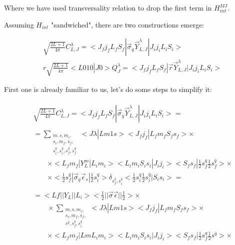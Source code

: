 Where we have used transversality relation to drop the first term in $H_{int}^{MJ}$.

Assuming $H_{int}$ "sandwiched", there are two constructions emerge:

\begin{align}
    &\sqrt{\frac{2L+1}{4\pi}} C_{L, J}^\lambda = <J_f j_f L_f S_f|\vec{\sigma}_{q} \vec{Y}^{\lambda}_{L, J}|J_i j_i L_i S_i> \\
    &r \sqrt{\frac{2L+1}{4\pi}} <L 0 1 0 | J 0> Q_{J}^\lambda = <J_f j_f L_f S_f|\vec{r} \vec{Y}^{\lambda}_{L, J}|J_i j_i L_i S_i>
\end{align}

First one is already familiar to us, let's do some steps to simplify it:

\begin{align} \label{app:hint-mult:Ccoef-reduce}
    \begin{split}
        &\sqrt{\frac{2L+1}{4 \pi}} C_{L, J}^\lambda = <J_f j_f L_f S_f| \vec{\sigma}_q \vec{Y}_{L, J}^\lambda |J_i j_i L_i S_i> =
    \end{split} \\
    \begin{split}
        &= \sum_{\substack{m, s, m_i,\\ s_i, m_f, s_f,\\ s_i^{q}, s_{i}^{\overline{q}}, s_{f}^{q}, s_{f}^{\overline{q}}}} <J \lambda| L m 1 s> <J_f j_f| L_f m_f S_f s_f> \times \\
        &\qquad\times <L_f m_f| Y_{L}^{m} |L_i m_i> <L_i m_i S_i s_i| J_i j_i> <S_f s_f| \frac{1}{2} s_f^{q} \frac{1}{2} s_f^{\overline{q}}> \times \\
        &\qquad\times <\frac{1}{2} s_f^q| \vec{\sigma}_q \vec{\epsilon}_{s} |\frac{1}{2} s_i^q> \delta_{s_f^{\overline{q}}, s_i^{\overline{q}}} <\frac{1}{2} s_i^{q} \frac{1}{2} s_i^{\overline{q}} |S_i s_i> =
    \end{split} \\
    \begin{split}
        &= <Lf|| Y_L ||L_i> <\frac{1}{2}|| \vec{\sigma}\vec{\epsilon} ||\frac{1}{2}> \times \\
        &\qquad\times \sum_{\substack{m, s, m_i,\\ s_i, m_f, s_f, \\s^{\overline{q}}, s_{f}^{q}, s_i^q}} <J \lambda| L m 1 s> <J_f j_f| L_f m_f S_f s_f> \times \\
        &\qquad\times <L_f m_f| L m L_i m_i> <L_i m_i S_i s_i| J_i j_i> <S_f s_f| \frac{1}{2} s_f^{q} \frac{1}{2} s^{\overline{q}}> \times \\

\end{split}
\end{align}
